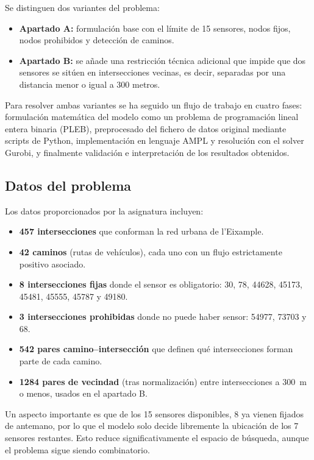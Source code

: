 \documentclass[12pt,a4paper]{article}
\begin{document}
Se distinguen dos variantes del problema:

\begin{itemize}
    \item \textbf{Apartado A:} formulación base con el límite de 15 sensores, nodos fijos, nodos prohibidos y detección de caminos.
    \item \textbf{Apartado B:} se añade una restricción técnica adicional que impide que dos sensores se sitúen en intersecciones vecinas, es decir, separadas por una distancia menor o igual a 300 metros.
\end{itemize}

Para resolver ambas variantes se ha seguido un flujo de trabajo en cuatro fases: formulación matemática del modelo como un problema de programación lineal entera binaria (PLEB), preprocesado del fichero de datos original mediante scripts de Python, implementación en lenguaje AMPL y resolución con el solver Gurobi, y finalmente validación e interpretación de los resultados obtenidos.

\subsection{Datos del problema}

Los datos proporcionados por la asignatura incluyen:

\begin{itemize}[itemsep=4pt]
    \item \textbf{457 intersecciones} que conforman la red urbana de l'Eixample.
    \item \textbf{42 caminos} (rutas de vehículos), cada uno con un flujo estrictamente positivo asociado.
    \item \textbf{8 intersecciones fijas} donde el sensor es obligatorio: 30, 78, 44628, 45173, 45481, 45555, 45787 y 49180.
    \item \textbf{3 intersecciones prohibidas} donde no puede haber sensor: 54977, 73703 y 68.
    \item \textbf{542 pares camino--intersección} que definen qué intersecciones forman parte de cada camino.
    \item \textbf{1284 pares de vecindad} (tras normalización) entre intersecciones a 300~m o menos, usados en el apartado B.
\end{itemize}

Un aspecto importante es que de los 15 sensores disponibles, 8 ya vienen fijados de antemano, por lo que el modelo solo decide libremente la ubicación de los 7 sensores restantes. Esto reduce significativamente el espacio de búsqueda, aunque el problema sigue siendo combinatorio.
\end{document}
